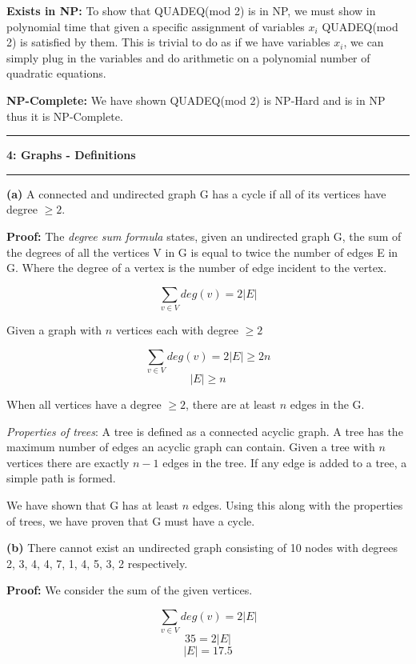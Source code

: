 \documentclass[11pt]{article}
\newcommand\question[2]{\vspace{.25in}\hrule\textbf{#1: #2}\vspace{.5em}\hrule\vspace{.10in}}
\renewcommand\part[1]{\vspace{.10in}\textbf{(#1)}}
\begin{document}
	\textbf{Exists in NP:} To show that QUADEQ(mod 2) is in NP, we must show in polynomial time that given a specific assignment of variables $x_i$ QUADEQ(mod 2) is satisfied by them. This is trivial to do as if we have variables $x_i$, we can simply plug in the variables and do arithmetic on a polynomial number of quadratic equations.
	
	\textbf{NP-Complete:} We have shown QUADEQ(mod 2) is NP-Hard and is in NP thus it is NP-Complete.
	
\newpage	
\question{4}{Graphs - Definitions}

\part{a} A connected and undirected graph G has a cycle if all of its vertices have degree $\geq 2$.

\textbf{Proof:} The \textit{degree sum formula} states, given an undirected graph G, the sum of the degrees of all the vertices V in G is equal to twice the number of edges E in G. Where the degree of a vertex is the number of edge incident to the vertex.

$$\sum_{v \in V} deg(v) = 2|E|$$

Given a graph with $n$ vertices each with degree $\geq 2$

$$\sum_{v \in V} deg(v) = 2|E| \geq 2n$$
$$|E| \geq n$$

When all vertices have a degree $\geq 2$, there are at least $n$ edges in the G. 

\textit{Properties of trees}: A tree is defined as a connected acyclic graph. A tree has the maximum number of edges an acyclic graph can contain. Given a tree with $n$ vertices there are exactly $n - 1$ edges in the tree. If any edge is added to a tree, a simple path is formed.

We have shown that G has at least $n$ edges. Using this along with the properties of trees, we have proven that G must have a cycle.

\part{b} There cannot exist an undirected graph consisting of 10 nodes with degrees 2, 3, 4, 4, 7, 1, 4, 5, 3, 2 respectively.

\textbf{Proof:} We consider the sum of the given vertices.

$$\sum_{v \in V} deg(v) = 2|E|$$
$$35 = 2|E|$$
$$|E| = 17.5$$
\end{document}
